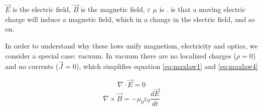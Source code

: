 \DIFaddbegin {}\DIFaddend $\vec{E}$ is the electric field, $\vec{B}$ is the magnetic
field, $\varepsilon$ \DIFdelbegin {}\DIFdelend \DIFaddbegin {}\DIFaddend $\mu$ is \DIFdelbegin {}\DIFdelend \DIFaddbegin {}\DIFaddend . \DIFaddbegin {}\DIFaddend %
\DIFdelbegin {}\DIFdelend \DIFaddbegin {}\DIFaddend is that a moving electric
charge will induce a magnetic field, which in \DIFdelbegin {}\DIFdelend \DIFaddbegin {}\DIFaddend a
change in the electric field, and so on.

In order to understand why these laws unify magnetism, electricity and
optics, we \DIFdelbegin {}\DIFdelend \DIFaddbegin {}\DIFaddend consider a special case: vacuum. In vacuum there are
no localized charges ($\rho = 0$) and no currents ($\vec{J}=0$), which
simplifies equation \ref{eq:maxlaw1} and \ref{eq:maxlaw4} \DIFdelbegin {}\DIFdelend \DIFaddbegin {}\DIFaddend 

\begin{equation} \nabla \cdot   \vec{E} = 0 \label{eq:maxlaw1_vac}\end{equation}
\begin{equation} \nabla \times \vec{B} = -\mu_0\varepsilon_0\frac{d\vec{E}}{dt}\label{eq:maxlaw4_vac}\end{equation}

